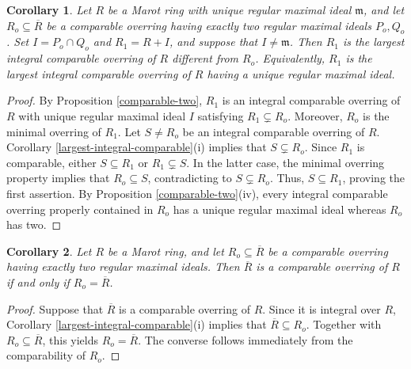 \documentclass[12pt]{article}
\newtheorem{corollary}{Corollary}
\begin{document}
	\begin{corollary}\label{largest-one-maximal}
		Let $R$ be a Marot ring with unique regular maximal ideal $\mathfrak{m}$, and let $R_o\subseteq\overline R$ be a comparable overring having exactly two regular maximal ideals $P_o,Q_o$. Set $I=P_o\cap Q_o$ and $R_1=R+I$, and suppose that $I\neq\mathfrak{m}$. Then $R_1$ is the largest integral comparable overring of $R$ different from $R_o$. Equivalently, $R_1$ is the largest integral comparable overring of $R$ having a unique regular maximal ideal.
	\end{corollary}
	\begin{proof}
		By Proposition \ref{comparable-two}, $R_1$ is an integral comparable overring of $R$ with unique regular maximal ideal $I$ satisfying $R_1\subsetneq R_o$. Moreover, $R_o$ is the minimal overring of $R_1$. Let $S\neq R_o$ be an integral comparable overring of $R$. Corollary \ref{largest-integral-comparable}(i) implies that $S\subsetneq R_o$. Since $R_1$ is comparable, either $S\subseteq R_1$ or $R_1\subsetneq S$. In the latter case, the minimal overring property implies that $R_o\subseteq S$, contradicting to $S\subsetneq R_o$. Thus, $S\subseteq R_1$, proving the first assertion. By Proposition \ref{comparable-two}(iv), every integral comparable overring properly contained in $R_o$ has a unique regular maximal ideal whereas $R_o$ has two.
	\end{proof}

\begin{corollary}\label{two-closure-comparable}
		Let $R$ be a Marot ring, and let $R_o\subseteq\overline R$ be a comparable overring having exactly two regular maximal ideals. Then $\overline R$ is a comparable overring of $R$ if and only if $R_o=\overline R$.
	\end{corollary}
	\begin{proof}
		Suppose that $\overline R$ is a comparable overring of $R$. Since it is integral over $R$, Corollary \ref{largest-integral-comparable}(i) implies that $\overline R\subseteq R_o$. Together with $R_o\subseteq\overline R$, this yields $R_o=\overline R$. The converse follows immediately from the comparability of $R_o$.
	\end{proof}
\end{document}
